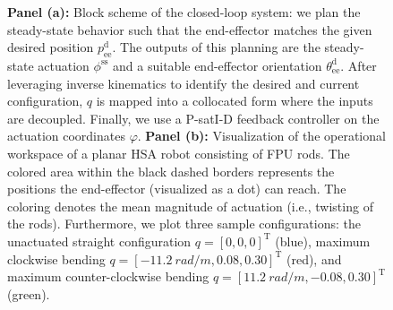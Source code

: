 \begin{figure}[ht]
    \centering
    \caption{\textbf{Panel (a):} Block scheme of the closed-loop system: we plan the steady-state behavior such that the end-effector matches the given desired position $p_\mathrm{ee}^\mathrm{d}$. The outputs of this planning are the steady-state actuation $\phi^\mathrm{ss}$ and a suitable end-effector orientation $\theta_\mathrm{ee}^\mathrm{d}$. After leveraging inverse kinematics to identify the desired and current configuration, $q$ is mapped into a collocated form where the inputs are decoupled. Finally, we use a P-satI-D feedback controller on the actuation coordinates $\varphi$. \textbf{Panel (b):} Visualization of the operational workspace of a planar HSA robot consisting of FPU rods. The colored area within the black dashed borders represents the positions the end-effector (visualized as a dot) can reach. The coloring denotes the mean magnitude of actuation (i.e., twisting of the rods). Furthermore, we plot three sample configurations: the unactuated straight configuration $q = [0, 0, 0]^\mathrm{T}$ (blue), maximum clockwise bending $q = [\SI{-11.2}{rad \per m}, 0.08, 0.30]^\mathrm{T}$ (red), and maximum counter-clockwise bending $q = [\SI{11.2}{rad \per m}, -0.08, 0.30]^\mathrm{T}$ (green).}
\end{figure}

